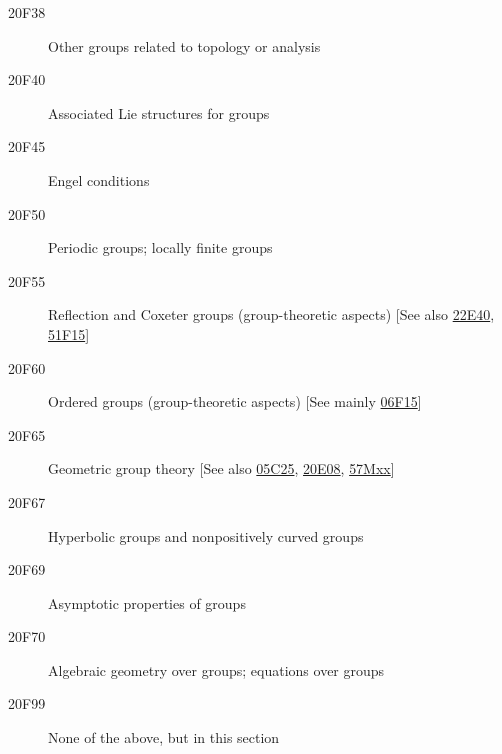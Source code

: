 \begin{description}
\item [20F38]\label{20F38} Other groups related to topology or analysis
\item [20F40]\label{20F40} Associated Lie structures for groups
\item [20F45]\label{20F45} Engel conditions
\item [20F50]\label{20F50} Periodic groups; locally finite groups
\item [20F55]\label{20F55} Reflection and Coxeter groups (group-theoretic aspects) [See also \hyperref[22E40]{22E40}, \hyperref[51F15]{51F15}]
\item [20F60]\label{20F60} Ordered groups (group-theoretic aspects) [See mainly \hyperref[06F15]{06F15}]
\item [20F65]\label{20F65} Geometric group theory [See also \hyperref[05C25]{05C25}, \hyperref[20E08]{20E08}, \hyperref[57Mxx]{57Mxx}]
\item [20F67]\label{20F67} Hyperbolic groups and nonpositively curved groups
\item [20F69]\label{20F69} Asymptotic properties of groups
\item [20F70]\label{20F70} Algebraic geometry over groups; equations over groups
\item [20F99]\label{20F99} None of the above, but in this section
\end{description}
